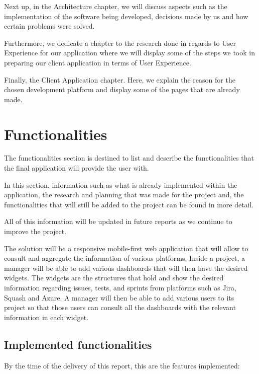 \documentclass[a4paper,twoside,10pt]{report}
\begin{document}
Next up, in the Architecture chapter, we will discuss aspects such as the implementation of the software being developed, decisions made by us and how certain problems were solved.

Furthermore, we dedicate a chapter to the research done in regards to User Experience for our application where we will display some of the steps we took in preparing our client application in terms of User Experience.

Finally, the Client Application chapter. Here, we explain the reason for the chosen development platform and display some of the pages that are already made.  



\chapter{Functionalities}
The functionalities section is destined to list and describe the functionalities that the final application will provide the user with.

In this section, information such as what is already implemented within the application, the research and planning that was made for the project and, the functionalities that will still be added to the project can be found in more detail.

All of this information will be updated in future reports as we continue to improve the project.


The solution will be a responsive mobile-first web application that will allow to consult and aggregate the information of various platforms. Inside a project, a manager will be able to add various dashboards that will then have the desired widgets. The widgets are the structures that hold and show the desired information regarding issues, tests, and sprints from platforms such as Jira\cite{JIRA}, Squash\cite{SQUASH} and Azure\cite{AZURE}. A manager will then be able to add various users to its project so that those users can consult all the dashboards with the relevant information in each widget.
\section{Implemented functionalities}
By the time of the delivery of this report, this are the features implemented:
 
\end{document}
